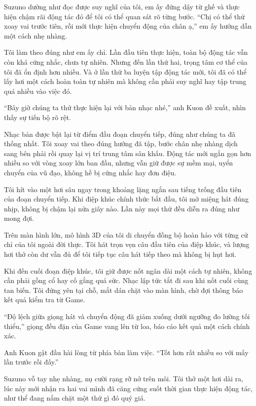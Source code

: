 ﻿\documentclass[../main.tex]{subfiles}
\begin{document}
Suzuno dường như đọc được suy nghĩ của tôi, em ấy đứng dậy từ ghế và thực hiện chậm rãi động tác đó để tôi có thể quan sát rõ từng bước. ``Chị có thể thử xoay vai trước tiên, rồi mới thực hiện chuyển động của chân ạ,'' em ấy hướng dẫn một cách nhẹ nhàng.

Tôi làm theo đúng như em ấy chỉ. Lần đầu tiên thực hiện, toàn bộ động tác vẫn còn khá cứng nhắc, chưa tự nhiên. Nhưng đến lần thứ hai, trọng tâm cơ thể của tôi đã ổn định hơn nhiều. Và ở lần thứ ba luyện tập động tác mới, tôi đã có thể lấy hơi một cách hoàn toàn tự nhiên mà không cần phải suy nghĩ hay tập trung quá nhiều vào việc đó.

``Bây giờ chúng ta thử thực hiện lại với bản nhạc nhé,'' anh Kuon đề xuất, nhìn thấy sự tiến bộ rõ rệt.

\ct

Nhạc bản được bật lại từ điểm đầu đoạn chuyển tiếp, đúng như chúng ta đã thống nhất. Tôi xoay vai theo đúng hướng đã tập, bước chân nhẹ nhàng dịch sang bên phải rồi quay lại vị trí trung tâm sân khấu. Động tác mới ngắn gọn hơn nhiều so với vòng xoay lớn ban đầu, nhưng vẫn giữ được sự mềm mại, uyển chuyển của vũ đạo, không hề bị cứng nhắc hay đơn điệu.

Tôi hít vào một hơi sâu ngay trong khoảng lặng ngắn sau tiếng trống đầu tiên của đoạn chuyển tiếp. Khi điệp khúc chính thức bắt đầu, tôi mở miệng hát đúng nhịp, không bị chậm lại nửa giây nào. Lần này mọi thứ đều diễn ra đúng như mong đợi.

Trên màn hình lớn, mô hình 3D của tôi di chuyển đồng bộ hoàn hảo với từng cử chỉ của tôi ngoài đời thực. Tôi hát trọn vẹn câu đầu tiên của điệp khúc, và lượng hơi thở còn dư vẫn đủ để tôi tiếp tục câu hát tiếp theo mà không bị hụt hơi.

Khi đến cuối đoạn điệp khúc, tôi giữ được nốt ngân dài một cách tự nhiên, không cần phải gồng cổ hay cố gắng quá sức. Nhạc lập tức tắt đi sau khi nốt cuối cùng tan biến. Tôi đứng yên tại chỗ, mắt dán chặt vào màn hình, chờ đợi thông báo kết quả kiểm tra từ Game.

``Độ lệch giữa giọng hát và chuyển động đã giảm xuống dưới ngưỡng đo lường tối thiểu,'' giọng đều đặn của Game vang lên từ loa, báo cáo kết quả một cách chính xác.

Anh Kuon gật đầu hài lòng từ phía bàn làm việc. ``Tốt hơn rất nhiều so với mấy lần trước rồi đấy.''

Suzuno vỗ tay nhẹ nhàng, nụ cười rạng rỡ nở trên môi. Tôi thở một hơi dài ra, lúc này mới nhận ra hai vai mình đã căng cứng suốt thời gian thực hiện động tác, như thể đang nắm chặt một thứ gì đó quý giá.
\end{document}
